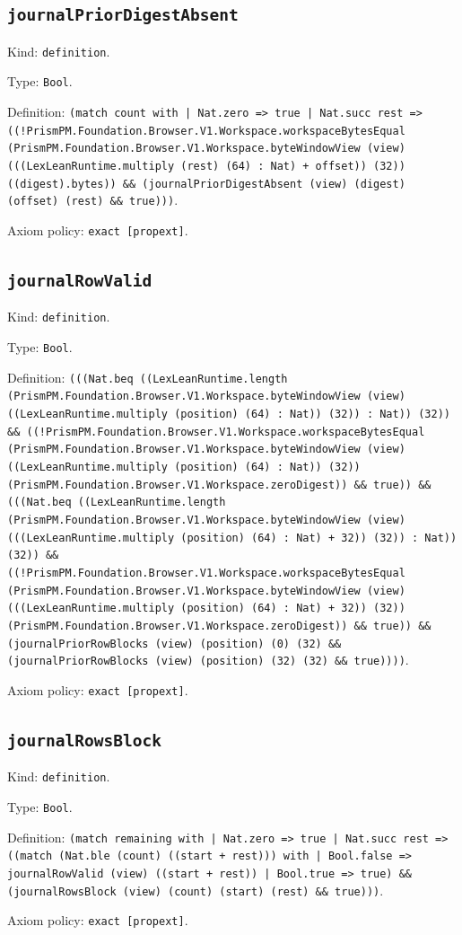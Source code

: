\documentclass[11pt]{article}
\begin{document}
\subsection*{\texttt{journalPriorDigestAbsent}}
\noindent Kind: \texttt{definition}.\par
\noindent Type: \texttt{Bool}.\par
\noindent Definition: \texttt{(match count with | Nat.zero => true | Nat.succ rest => ((!PrismPM.Foundation.Browser.V1.Workspace.workspaceBytesEqual (PrismPM.Foundation.Browser.V1.Workspace.byteWindowView (view) (((LexLeanRuntime.multiply (rest) (64) : Nat) + offset)) (32)) ((digest).bytes)) \&\& (journalPriorDigestAbsent (view) (digest) (offset) (rest) \&\& true)))}.\par
\noindent Axiom policy: \texttt{exact [propext]}.\par
\subsection*{\texttt{journalRowValid}}
\noindent Kind: \texttt{definition}.\par
\noindent Type: \texttt{Bool}.\par
\noindent Definition: \texttt{(((Nat.beq ((LexLeanRuntime.length (PrismPM.Foundation.Browser.V1.Workspace.byteWindowView (view) ((LexLeanRuntime.multiply (position) (64) : Nat)) (32)) : Nat)) (32)) \&\& ((!PrismPM.Foundation.Browser.V1.Workspace.workspaceBytesEqual (PrismPM.Foundation.Browser.V1.Workspace.byteWindowView (view) ((LexLeanRuntime.multiply (position) (64) : Nat)) (32)) (PrismPM.Foundation.Browser.V1.Workspace.zeroDigest)) \&\& true)) \&\& (((Nat.beq ((LexLeanRuntime.length (PrismPM.Foundation.Browser.V1.Workspace.byteWindowView (view) (((LexLeanRuntime.multiply (position) (64) : Nat) + 32)) (32)) : Nat)) (32)) \&\& ((!PrismPM.Foundation.Browser.V1.Workspace.workspaceBytesEqual (PrismPM.Foundation.Browser.V1.Workspace.byteWindowView (view) (((LexLeanRuntime.multiply (position) (64) : Nat) + 32)) (32)) (PrismPM.Foundation.Browser.V1.Workspace.zeroDigest)) \&\& true)) \&\& (journalPriorRowBlocks (view) (position) (0) (32) \&\& (journalPriorRowBlocks (view) (position) (32) (32) \&\& true))))}.\par
\noindent Axiom policy: \texttt{exact [propext]}.\par
\subsection*{\texttt{journalRowsBlock}}
\noindent Kind: \texttt{definition}.\par
\noindent Type: \texttt{Bool}.\par
\noindent Definition: \texttt{(match remaining with | Nat.zero => true | Nat.succ rest => ((match (Nat.ble (count) ((start + rest))) with | Bool.false => journalRowValid (view) ((start + rest)) | Bool.true => true) \&\& (journalRowsBlock (view) (count) (start) (rest) \&\& true)))}.\par
\noindent Axiom policy: \texttt{exact [propext]}.\par
\end{document}
